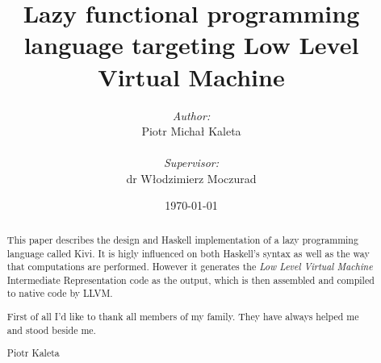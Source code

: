 \documentclass[a4paper]{report}
\begin{document}


\title{Lazy functional programming language targeting Low Level Virtual Machine}
\author{\textit{Author:}\\Piotr Micha\l{} Kaleta\\\\\emph{Supervisor:}\\dr W\l{}odzimierz Moczurad}
\date{\today}

\maketitle
{}

\newpage
\thispagestyle{empty}
\mbox{}

\Huge
\begin{abstract}
  \normalsize
  \center
  This paper describes the design and Haskell implementation of a lazy
  programming language called Kivi. It is higly influenced on both Haskell's
  syntax as well as the way that computations are performed. However it generates
  the \textit{Low Level Virtual Machine}\cite{website:llvm} Intermediate
  Representation code as the output, which is then assembled and compiled to
  native code by LLVM.
\end{abstract}


\renewcommand{\abstractname}{Acknowledgements}
\begin{abstract}
  \normalsize
  \center
  First of all I'd like to thank all members of my family. They have
  always helped me and stood beside me.
  \begin{flushright}
    Piotr Kaleta
  \end{flushright}
\end{abstract}
\end{document}
